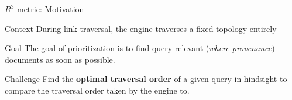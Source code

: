 
\begin{frame}{$R^{3}$ metric: Motivation}
    \begin{block}{Context}
        During link traversal, the engine traverses a fixed topology entirely
    \end{block}

    \begin{block}{Goal}
        The goal of prioritization is to find query-relevant (\emph{where-provenance}) documents as soon as possible.
    \end{block}

  \begin{alertblock}{Challenge}
        Find the \textbf{optimal traversal order} of a given query in hindsight to compare the traversal order taken by the engine to.
    \end{alertblock}
\end{frame}
